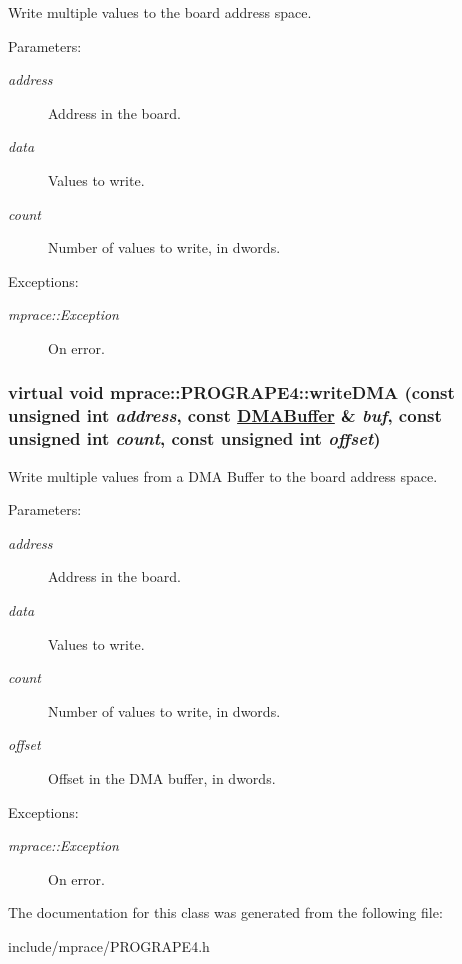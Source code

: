 Write multiple values to the board address space. 

\begin{Desc}
\item[Parameters:]
\begin{description}
\item[{\em address}]Address in the board. \item[{\em data}]Values to write. \item[{\em count}]Number of values to write, in dwords. \end{description}
\end{Desc}
\begin{Desc}
\item[Exceptions:]
\begin{description}
\item[{\em mprace::Exception}]On error.\end{description}
\end{Desc}
\hypertarget{classmprace_1_1PROGRAPE4_a6}{
\subsubsection[writeDMA]{\setlength{\rightskip}{0pt plus 5cm}virtual void mprace::PROGRAPE4::write\-DMA (const unsigned int {\em address}, const \hyperlink{classmprace_1_1DMABuffer}{DMABuffer} \& {\em buf}, const unsigned int {\em count}, const unsigned int {\em offset})}}
\label{classmprace_1_1PROGRAPE4_a6}


Write multiple values from a DMA Buffer to the board address space. 

\begin{Desc}
\item[Parameters:]
\begin{description}
\item[{\em address}]Address in the board. \item[{\em data}]Values to write. \item[{\em count}]Number of values to write, in dwords. \item[{\em offset}]Offset in the DMA buffer, in dwords. \end{description}
\end{Desc}
\begin{Desc}
\item[Exceptions:]
\begin{description}
\item[{\em mprace::Exception}]On error.\end{description}
\end{Desc}


The documentation for this class was generated from the following file:\begin{CompactItemize}
\item 
include/mprace/PROGRAPE4.h\end{CompactItemize}
